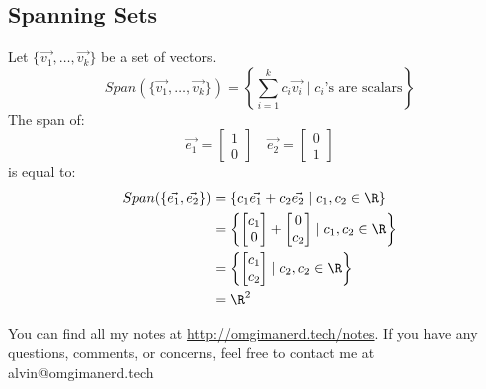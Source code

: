 \documentclass[letterpaper, 12pt]{math}
\begin{document}
\subsection*{Spanning Sets}
Let \( \{\vec{v_1},\dots,\vec{v_k}\} \) be a set of vectors.
\[ Span(\{\vec{v_1},\dots,\vec{v_k}\}) = \left\{\sum_{i=1}^{k}c_i\vec{v_i}\mid
  c_i \text{'s are scalars}\right\} \]
The span of:
\[ \vec{e_1} = \begin{bmatrix}1 \\ 0\end{bmatrix}\quad
  \vec{e_2} = \begin{bmatrix}0 \\ 1\end{bmatrix} \]
is equal to:
\begin{align*}
  Span(\{\vec{e_1},\vec{e_2}\}) &=
    \{c_1\vec{e_1}+c_2\vec{e_2}\mid c_1,c_2\in\R\} \\
  &= \left\{\begin{bmatrix}c_1 \\ 0\end{bmatrix}+
    \begin{bmatrix}0 \\ c_2\end{bmatrix}\mid c_1,c_2\in\R\right\} \\
  &= \left\{\begin{bmatrix}c_1 \\ c_2\end{bmatrix}\mid c_2,c_2\in\R\right\} \\
  &= \R^2
\end{align*}

\begin{center}
  You can find all my notes at \url{http://omgimanerd.tech/notes}. If you have
  any questions, comments, or concerns, feel free to contact me at
  alvin@omgimanerd.tech
\end{center}
\end{document}
